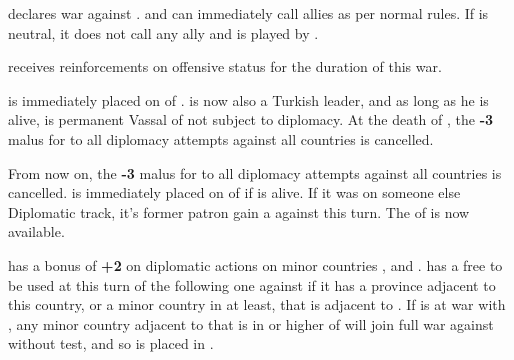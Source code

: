 


\phevnt
\aparag \paysperse declares war against \TUR.
\aparag \paysperse and \TUR can immediately call allies as per normal rules.
\aparag If \paysperse is neutral, it does not call any ally and is played by
\SPA.

\phadm
\aparag \paysperse receives reinforcements on offensive status for the
duration of this war.






\phevnt
\aparag \paysAlgerie is immediately placed on \VASSAL of \TUR.
\aparag \leaderBarbaros is now also a Turkish leader, and as long as he is
alive, \paysAlgerie is permanent Vassal of \TUR not subject to diplomacy.
\aparag At the death of \leaderBarbaros, the {\bf -3} malus for \TUR to all
diplomacy attempts against all  countries is cancelled.





\phevnt
\aparag From now on, the {\bf -3} malus for \TUR to all diplomacy attempts
against all  countries is cancelled.
\aparag \paysTunisie is immediately placed on \VASSAL of \TUR if \leaderDragut
is alive.
\bparag If it was on someone else Diplomatic track, it's former patron gain a
\CB against \paysTunisie this turn.
\aparag The \corsaire of \paysMaroc is now available.






\phdipl
\aparag \TUR has a bonus of {\bf +2} on diplomatic actions on minor countries
\paysMoldavie, \paysValachie and \paysTransylvanie.
\aparag \TUR has a free \CB to be used at this turn of the following one
against \POL if it has a province adjacent to this country, or a minor country
in \AM at least, that is adjacent to \POL.
\aparag If \TUR is at war with \POL, any minor country adjacent to \POL that
is in \AM or higher of \TUR will join full war against \POL without test, and
so is placed in \EG.

